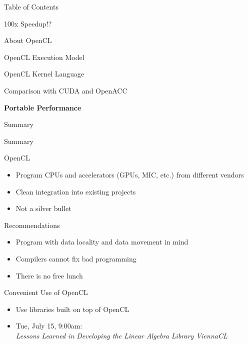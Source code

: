 \begin{frame}{Table of Contents}
 \begin{block}{100x Speedup!?} \end{block}
 \begin{block}{About OpenCL} \end{block}
 \begin{block}{OpenCL Execution Model} \end{block}
 \begin{block}{OpenCL Kernel Language} \end{block}
 \begin{block}{Comparison with CUDA and OpenACC} \end{block}
 \begin{block}{\textbf{Portable Performance}} \end{block}
 \begin{block}{Summary} \end{block}
\end{frame}






\begin{frame}{Summary}
 
 \begin{block}{OpenCL}
  \begin{itemize}
   \item Program CPUs and accelerators (GPUs, MIC, etc.) from different vendors
   \item Clean integration into existing projects
   \item Not a silver bullet
  \end{itemize}
 \end{block}

 \begin{block}{Recommendations}
  \begin{itemize}
   \item Program with data locality and data movement in mind
   \item Compilers cannot fix bad programming
   \item There is no free lunch
  \end{itemize}
 \end{block}

  \begin{block}{Convenient Use of OpenCL}
  \begin{itemize}
   \item Use libraries built on top of OpenCL
   \item \begin{center} Tue, July 15, 9:00am: \\ \textit{Lessons Learned in Developing the Linear Algebra Library ViennaCL} \end{center}
  \end{itemize}
 \end{block}


\end{frame}
